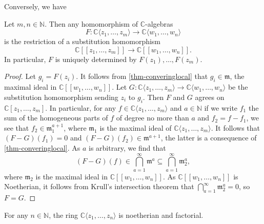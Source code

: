 Conversely, we have
\begin{lemma}\label{lma-homopowerringanalytic}
    Let $m,n\in \mathbb{N}$. Then any homomorphism of $\mathbb{C}$-algebras 
    \[
        F:  \mathbb{C}\langle z_1,\ldots,z_m\rangle\rightarrow  \mathbb{C}\langle w_1,\ldots,w_n\rangle
    \]
    is the restriction of a substitution homomorphism
    \[
        \mathbb{C}[[z_1,\ldots,z_m]]\rightarrow  \mathbb{C} [[ w_1,\ldots,w_n]].
    \]
    In particular, $F$ is uniquely determined by $F(z_1),\ldots,F(z_m)$.  
\end{lemma}
\begin{proof}
    Let $g_i=F(z_i)$. It follows from \cref{thm-converinglocal} that $g_i\in \mathfrak{m}$, the maximal ideal in $\mathbb{C} [[ w_1,\ldots,w_n]]$. Let $G:\mathbb{C}\langle z_1,\ldots,z_m\rangle\rightarrow  \mathbb{C}\langle w_1,\ldots,w_n\rangle$ be the substitution homomorphism sending $z_i$ to $g_i$. Then $F$ and $G$ agrees on $\mathbb{C}[z_1,\ldots,z_m]$. In particular, for any $f\in \mathbb{C}\langle z_1,\ldots,z_m\rangle$ and $a\in \mathbb{N}$ if we write $f_1$ the sum of the homogeneous parts of $f$ of degree no more than $a$ and $f_2=f-f_1$, we see that $f_2\in \mathfrak{m}_1^{a+1}$, where $\mathfrak{m}_1$ is the maximal ideal of $\mathbb{C}\langle z_1,\ldots,z_m\rangle$. It follows that $(F-G)(f_1)=0$ and $(F-G)(f_2)\in \mathfrak{m}^{a+1}$, the latter is a consequence of \cref{thm-converinglocal}.
    As $a$ is arbitrary, we find that
    \[
      (F-G)(f)\in \bigcap_{a=1}^{\infty}\mathfrak{m}^a\subseteq  \bigcap_{a=1}^{\infty}\mathfrak{m}_2^a,
    \]
    where $\mathfrak{m}_2$ is the maximal ideal in $\mathbb{C} [[ w_1,\ldots,w_n]]$.
    As $\mathbb{C}[[w_1,\ldots,w_n]] $ is Noetherian, it follows from Krull's intersection theorem \cite[\href{https://stacks.math.columbia.edu/tag/00IP}{Tag 00IP}]{stacks-project} that $\bigcap_{a=1}^{\infty}\mathfrak{m}_2^a=0$, so $F=G$.
\end{proof}

\begin{theorem}
    For any $n\in \mathbb{N}$, the ring $\mathbb{C}\langle z_1,\ldots,z_n \rangle$ is noetherian and factorial.
\end{theorem}

